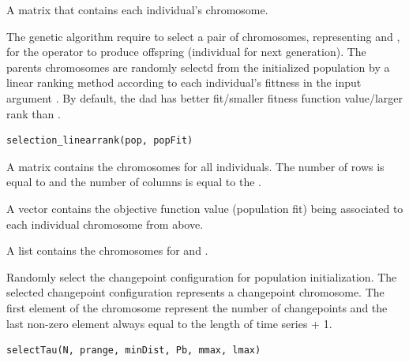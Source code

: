 \documentclass[a4paper]{book}
\begin{document}
%
\begin{Value}
A matrix that contains each individual's chromosome.
\end{Value}
%
\begin{Description}
The genetic algorithm require to select a pair of chromosomes, representing
 and , for the  operator to
produce offspring (individual for next generation). The parents chromosomes
are randomly selectd from the initialized population by a linear ranking
method according to each individual's fittness in the input argument
. By default, the dad has better fit/smaller fitness function
value/larger rank than .
\end{Description}
%
\begin{Usage}
\begin{verbatim}
selection_linearrank(pop, popFit)
\end{verbatim}
\end{Usage}
%
\begin{Arguments}
\begin{ldescription}
\item[\code{pop}] A matrix contains the chromosomes for all individuals. The number of
rows is equal to  and the number of columns is equal to the
.

\item[\code{popFit}] A vector contains the objective function value (population fit)
being associated to each individual chromosome from above.
\end{ldescription}
\end{Arguments}
%
\begin{Value}
A list contains the chromosomes for  and .
\end{Value}
%
\begin{Description}
Randomly select the changepoint configuration for population initialization.
The selected changepoint configuration represents a changepoint chromosome.
The first element of the chromosome represent the number of changepoints
and the last non-zero element always equal to the length of time series + 1.
\end{Description}
%
\begin{Usage}
\begin{verbatim}
selectTau(N, prange, minDist, Pb, mmax, lmax)
\end{verbatim}
\end{Usage}
\end{document}
